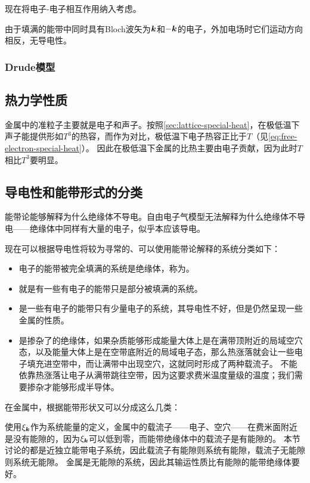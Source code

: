 现在将电子-电子相互作用纳入考虑。

由于填满的能带中同时具有Bloch波矢为$\vb*{k}$和$-\vb*{k}$的电子，外加电场时它们运动方向相反，无导电性。

\subsubsection{Drude模型}

\subsection{热力学性质}


金属中的准粒子主要就是电子和声子。按照\autoref{sec:lattice-special-heat}，在极低温下声子能提供形如$T^3$的热容，而作为对比，极低温下电子热容正比于$T$（见\eqref{eq:free-electron-special-heat}）。
因此在极低温下金属的比热主要由电子贡献，因为此时$T$相比$T^3$要明显。

\subsection{导电性和能带形式的分类}\label{sec:conductor-classification}

能带论能够解释为什么绝缘体不导电。自由电子气模型无法解释为什么绝缘体不导电——绝缘体中同样有大量的电子，似乎本应该导电。


现在可以根据导电性将较为寻常的、可以使用能带论解释的系统分类如下：
\begin{itemize}
    \item 电子的能带被完全填满的系统是绝缘体，称为。
    \item {}就是有一些有电子的能带只是部分被填满的系统。
    \item {}是一些有电子的能带只有少量电子的系统，其导电性不好，但是仍然呈现一些金属的性质。
    \item {}是掺杂了的绝缘体，如果杂质能够形成能量大体上是在满带顶附近的局域空穴态，以及能量大体上是在空带底附近的局域电子态，那么热涨落就会让一些电子填充进空带中，而让满带中出现空穴，这就同时形成了两种载流子。
    不能依靠热涨落让电子从满带跳往空带，因为这要求费米温度量级的温度；我们需要掺杂才能够形成半导体。
\end{itemize}

在金属中，根据能带形状又可以分成这么几类：

使用$\xi_{\vb*{k}}$作为系统能量的定义，金属中的载流子——电子、空穴——在费米面附近是没有能隙的，因为$\xi_{\vb*{k}}$可以低到零，而能带绝缘体中的载流子是有能隙的。
本节讨论的都是近独立能带电子系统，因此载流子有能隙则系统有能隙，载流子无能隙则系统无能隙。
金属是无能隙的系统，因此其输运性质比有能隙的能带绝缘体要好。

